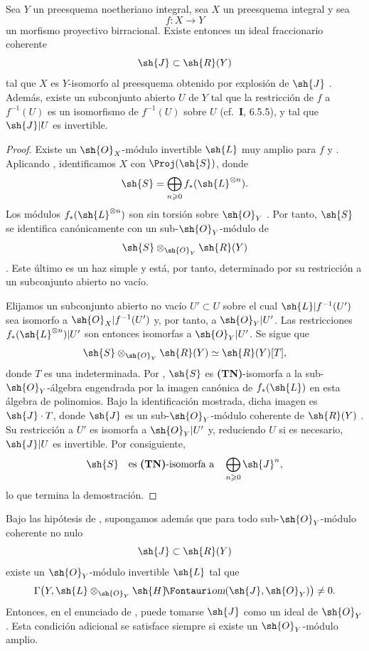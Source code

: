 \documentclass[oneside]{amsart}
\makeatletter
\renewcommand{\geq}{\geqslant}
\newcommand*{\ega@sheafop}[3]{\sh{#1}#2\textup{\kern-2.2pt{\Fontauri\slshape #3}}}
\newcommand*{\shHom}{\ega@sheafop{H}{}{om}}
\newcommand{\oldpage}[2][]{{\marginnote{\normalfont\textbf{#1}~|~#2}}\ignorespaces}
\let\EGAOriginalLabel\label
\renewcommand{\label}[1]{\phantomsection\EGAOriginalLabel{#1}}
\makeatother
\begin{document}
\oldpage[III]{106}
\begin{proposition}[2.3.5]
\label{III.2.3.5}
Sea $Y$ un preesquema noetheriano integral, sea $X$ un preesquema integral y sea
\[
  f:X\longrightarrow Y
\]
un morfismo \textup{proyectivo birracional}.
Existe entonces un ideal fraccionario coherente
\[
  \sh{J}\subset\sh{R}(Y)
\]
 tal que $X$ es $Y$-isomorfo al preesquema obtenido por explosión de $\sh{J}$ .
Además, existe un subconjunto abierto $U$ de $Y$ tal que la restricción de $f$ a $f^{-1}(U)$ es un isomorfismo de $f^{-1}(U)$ sobre $U$ \textup{(cf.\ \textbf{I}, 6.5.5)}, y tal que $\sh{J}|U$ es invertible.
\end{proposition}

\begin{proof}
Existe un $\sh{O}_X$-módulo invertible $\sh{L}$ muy amplio para $f$  y .
Aplicando , identificamos $X$ con $\Proj(\sh{S})$, donde
\[
  \sh{S}=\bigoplus_{n\geq0}f_*(\sh{L}^{\otimes n}).
\]
Los módulos $f_*(\sh{L}^{\otimes n})$ son sin torsión sobre $\sh{O}_Y$ .
Por tanto, $\sh{S}$ se identifica canónicamente con un sub-$\sh{O}_Y$-módulo de
\[
  \sh{S}\otimes_{\sh{O}_Y}\sh{R}(Y)
\]
.
Este último es un haz simple  y está, por tanto, determinado por su restricción a un subconjunto abierto no vacío.

Elijamos un subconjunto abierto no vacío $U'\subset U$ sobre el cual $\sh{L}|f^{-1}(U')$ sea isomorfo a $\sh{O}_X|f^{-1}(U')$ y, por tanto, a $\sh{O}_Y|U'$.
Las restricciones $f_*(\sh{L}^{\otimes n})|U'$ son entonces isomorfas a $\sh{O}_Y|U'$.
Se sigue que
\[
  \sh{S}\otimes_{\sh{O}_Y}\sh{R}(Y)
  \simeq\sh{R}(Y)[T],
\]
donde $T$ es una indeterminada.
Por , $\sh{S}$ es \textbf{(TN)}-isomorfa a la sub-$\sh{O}_Y$-álgebra engendrada por la imagen canónica de $f_*(\sh{L})$ en esta álgebra de polinomios.
Bajo la identificación mostrada, dicha imagen es $\sh{J}\cdot T$, donde $\sh{J}$ es un sub-$\sh{O}_Y$-módulo coherente de $\sh{R}(Y)$ .
Su restricción a $U'$ es isomorfa a $\sh{O}_Y|U'$ y, reduciendo $U$ si es necesario, $\sh{J}|U$ es invertible.
Por consiguiente,
\[
  \sh{S}\quad\text{es \textbf{(TN)}-isomorfa a}\quad
  \bigoplus_{n\geq0}\sh{J}^n,
\]
lo que termina la demostración.
\end{proof}

\begin{corollary}[2.3.6]
\label{III.2.3.6}
Bajo las hipótesis de , supongamos además que para todo sub-$\sh{O}_Y$-módulo coherente no nulo
\[
  \sh{J}\subset\sh{R}(Y)
\]
existe un $\sh{O}_Y$-módulo invertible $\sh{L}$ tal que
\[
  \Gamma\bigl(Y,\sh{L}\otimes_{\sh{O}_Y}
  \shHom(\sh{J},\sh{O}_Y)\bigr)\neq0.
\]
Entonces, en el enunciado de , puede tomarse $\sh{J}$ como un ideal de $\sh{O}_Y$.
Esta condición adicional se satisface siempre si existe un $\sh{O}_Y$-módulo amplio.
\end{corollary}
\end{document}
